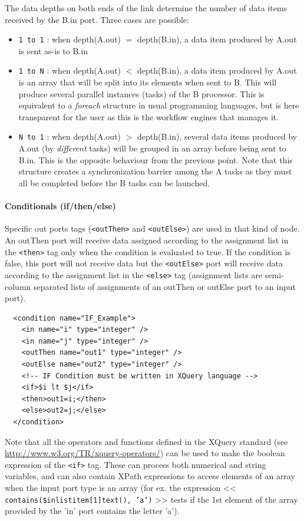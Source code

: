 \begin{itemize}
The data depths on both ends of the link determine the number of data items received by the B.in port. Three cases are possible:
 \begin{itemize}
\item \texttt{1 to 1} : when depth(A.out) $=$ depth(B.in), a data item produced by A.out is sent as-is to B.in
\item \texttt{1 to N} : when depth(A.out) $<$ depth(B.in), a data item produced by A.out is an array that will be split into its elements when sent to B. This will produce several parallel instances (tasks) of the B processor. This is equivalent to a \textit{foreach} structure in usual programming languages, but is here transparent for the user as this is the workflow engines that manages it.
\item \texttt{N to 1} : when depth(A.out) $>$ depth(B.in), several data items produced by A.out (by \textit{different} tasks) will be grouped in an array before being sent to B.in. This is the opposite behaviour from the previous point. Note that this structure creates a synchronization barrier among the A tasks as they must all be completed before the B tasks can be launched.
 \end{itemize}

\paragraph{Conditionals (if/then/else)} Specific out ports tags (\texttt{<outThen>} and \texttt{<outElse>}) are
used in that kind of node. An outThen port will receive data assigned according to the assignment list in the \texttt{<then>} tag only
when the condition is evaluated to true. If the condition is false, this port will not receive data but the \texttt{<outElse>} port will
receive data according to the assignment list in the \texttt{<else>} tag (assignment lists are semi-column separated lists of assignments of an outThen or outElse port to an input port).
\begin{verbatim}
  <condition name="IF_Example">
    <in name="i" type="integer" />
    <in name="j" type="integer" />
    <outThen name="out1" type="integer" />
    <outElse name="out2" type="integer" />
    <!-- IF Condition must be written in XQuery language -->
    <if>$i lt $j</if>
    <then>out1=i;</then>
    <else>out2=j;</else>
  </condition>
\end{verbatim}
Note that all the operators and functions defined in the XQuery standard (see \url{http://www.w3.org/TR/xquery-operators/}) can be used to make the boolean expression of the \texttt{<if>} tag. These can process both numerical and string variables, and can also contain XPath expressions to access elements of an array when the input port type is an array (for ex. the expression <<  \texttt{contains(\$in\/list\/item[1]\/text(), 'a')} >> tests if the 1st element of the array provided by the 'in' port contains the letter 'a').



\end{itemize}
